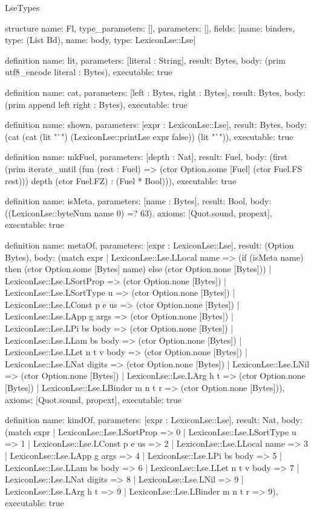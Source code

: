 \begin{lexlean}{LseTypes}
\begin{semanticmodule}
structure{
  name: Fl,
  type_parameters: [],
  parameters: [],
  fields: [{name: binders, type: (List Bd)}, {name: body, type: LexiconLse::Lse}]
}

definition{
  name: lit,
  parameters: [literal : String],
  result: Bytes,
  body: (prim utf8_encode literal : Bytes),
  executable: true
}

definition{
  name: cat,
  parameters: [left : Bytes, right : Bytes],
  result: Bytes,
  body: (prim append left right : Bytes),
  executable: true
}

definition{
  name: shown,
  parameters: [expr : LexiconLse::Lse],
  result: Bytes,
  body: (cat (cat (lit "`") (LexiconLse::printLse expr false)) (lit "`")),
  executable: true
}

definition{
  name: mkFuel,
  parameters: [depth : Nat],
  result: Fuel,
  body: (first (prim iterate_until (fun (rest : Fuel) => (ctor Option.some [Fuel] (ctor Fuel.FS rest))) depth (ctor Fuel.FZ) : (Fuel * Bool))),
  executable: true
}

definition{
  name: isMeta,
  parameters: [name : Bytes],
  result: Bool,
  body: ((LexiconLse::byteNum name 0) =? 63),
  axioms: [Quot.sound, propext],
  executable: true
}

definition{
  name: metaOf,
  parameters: [expr : LexiconLse::Lse],
  result: (Option Bytes),
  body: (match expr
    | LexiconLse::Lse.LLocal name => (if (isMeta name) then (ctor Option.some [Bytes] name) else (ctor Option.none [Bytes]))
    | LexiconLse::Lse.LSortProp => (ctor Option.none [Bytes])
    | LexiconLse::Lse.LSortType u => (ctor Option.none [Bytes])
    | LexiconLse::Lse.LConst p e us => (ctor Option.none [Bytes])
    | LexiconLse::Lse.LApp g args => (ctor Option.none [Bytes])
    | LexiconLse::Lse.LPi bs body => (ctor Option.none [Bytes])
    | LexiconLse::Lse.LLam bs body => (ctor Option.none [Bytes])
    | LexiconLse::Lse.LLet n t v body => (ctor Option.none [Bytes])
    | LexiconLse::Lse.LNat digits => (ctor Option.none [Bytes])
    | LexiconLse::Lse.LNil => (ctor Option.none [Bytes])
    | LexiconLse::Lse.LArg h t => (ctor Option.none [Bytes])
    | LexiconLse::Lse.LBinder m n t r => (ctor Option.none [Bytes])),
  axioms: [Quot.sound, propext],
  executable: true
}

definition{
  name: kindOf,
  parameters: [expr : LexiconLse::Lse],
  result: Nat,
  body: (match expr
    | LexiconLse::Lse.LSortProp => 0
    | LexiconLse::Lse.LSortType u => 1
    | LexiconLse::Lse.LConst p e us => 2
    | LexiconLse::Lse.LLocal name => 3
    | LexiconLse::Lse.LApp g args => 4
    | LexiconLse::Lse.LPi bs body => 5
    | LexiconLse::Lse.LLam bs body => 6
    | LexiconLse::Lse.LLet n t v body => 7
    | LexiconLse::Lse.LNat digits => 8
    | LexiconLse::Lse.LNil => 9
    | LexiconLse::Lse.LArg h t => 9
    | LexiconLse::Lse.LBinder m n t r => 9),
  executable: true
}


\end{semanticmodule}
\end{lexlean}
